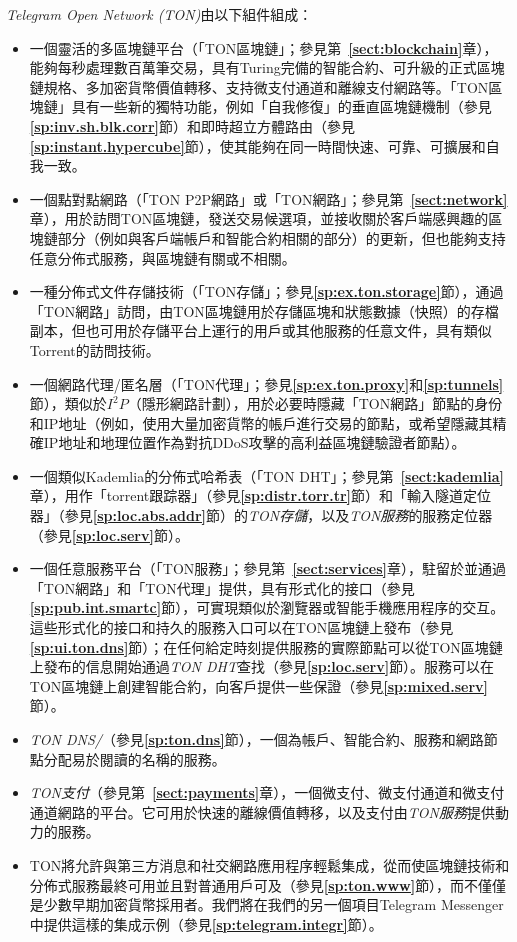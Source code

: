 \documentclass[12pt,oneside]{article}
\def\refpoint#1{{\rm\textbf{\ref{#1}}}}
\let\ptref=\refpoint
\begin{document}
{\em Telegram Open Network (TON)}由以下組件組成：
\begin{itemize}
\item 一個靈活的多區塊鏈平台（「TON區塊鏈」；參見第~\ptref{sect:blockchain}章），能夠每秒處理數百萬筆交易，具有Turing完備的智能合約、可升級的正式區塊鏈規格、多加密貨幣價值轉移、支持微支付通道和離線支付網路等。「TON區塊鏈」具有一些新的獨特功能，例如「自我修復」的垂直區塊鏈機制（參見\ptref{sp:inv.sh.blk.corr}節）和即時超立方體路由（參見\ptref{sp:instant.hypercube}節），使其能夠在同一時間快速、可靠、可擴展和自我一致。
\item 一個點對點網路（「TON P2P網路」或「TON網路」；參見第~\ptref{sect:network}章），用於訪問TON區塊鏈，發送交易候選項，並接收關於客戶端感興趣的區塊鏈部分（例如與客戶端帳戶和智能合約相關的部分）的更新，但也能夠支持任意分佈式服務，與區塊鏈有關或不相關。
\item 一種分佈式文件存儲技術（「TON存儲」；參見\ptref{sp:ex.ton.storage}節），通過「TON網路」訪問，由TON區塊鏈用於存儲區塊和狀態數據（快照）的存檔副本，但也可用於存儲平台上運行的用戶或其他服務的任意文件，具有類似Torrent的訪問技術。
\item 一個網路代理/匿名層（「TON代理」；參見\ptref{sp:ex.ton.proxy}和\ptref{sp:tunnels}節），類似於$I^2P$（隱形網路計劃），用於必要時隱藏「TON網路」節點的身份和IP地址（例如，使用大量加密貨幣的帳戶進行交易的節點，或希望隱藏其精確IP地址和地理位置作為對抗DDoS攻擊的高利益區塊鏈驗證者節點）。
\item 一個類似Kademlia的分佈式哈希表（「TON DHT」；參見第~\ptref{sect:kademlia}章），用作「torrent跟踪器」（參見\ptref{sp:distr.torr.tr}節）和「輸入隧道定位器」（參見\ptref{sp:loc.abs.addr}節）的{\em TON存儲}，以及{\em TON服務}的服務定位器（參見\ptref{sp:loc.serv}節）。
\item 一個任意服務平台（「TON服務」；參見第~\ptref{sect:services}章），駐留於並通過「TON網路」和「TON代理」提供，具有形式化的接口（參見\ptref{sp:pub.int.smartc}節），可實現類似於瀏覽器或智能手機應用程序的交互。這些形式化的接口和持久的服務入口可以在TON區塊鏈上發布（參見\ptref{sp:ui.ton.dns}節）；在任何給定時刻提供服務的實際節點可以從TON區塊鏈上發布的信息開始通過{\em TON DHT}查找（參見\ptref{sp:loc.serv}節）。服務可以在TON區塊鏈上創建智能合約，向客戶提供一些保證（參見\ptref{sp:mixed.serv}節）。
\item {\em TON DNS/}（參見\ptref{sp:ton.dns}節），一個為帳戶、智能合約、服務和網路節點分配易於閱讀的名稱的服務。
\item {\em TON支付}（參見第~\ptref{sect:payments}章），一個微支付、微支付通道和微支付通道網路的平台。它可用於快速的離線價值轉移，以及支付由{\em TON服務}提供動力的服務。
\item TON將允許與第三方消息和社交網路應用程序輕鬆集成，從而使區塊鏈技術和分佈式服務最終可用並且對普通用戶可及（參見\ptref{sp:ton.www}節），而不僅僅是少數早期加密貨幣採用者。我們將在我們的另一個項目Telegram Messenger中提供這樣的集成示例（參見\ptref{sp:telegram.integr}節）。
\end{itemize}
\end{document}
